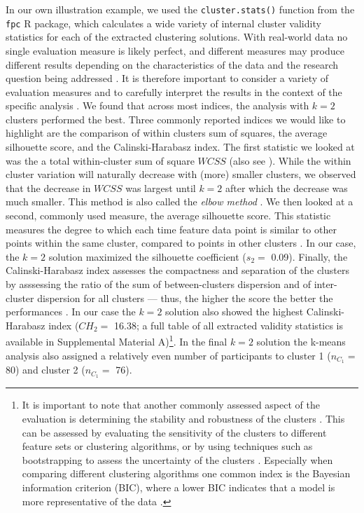 In our own illustration example, we used the \texttt{cluster.stats()}
function from the \texttt{fpc} \textsf{R} package, which calculates a
wide variety of internal cluster validity statistics for each of the
extracted clustering solutions. With real-world data no single
evaluation measure is likely perfect, and different measures may produce
different results depending on the characteristics of the data and the
research question being addressed \citep{kittler1998}. It is therefore
important to consider a variety of evaluation measures and to carefully
interpret the results in the context of the specific analysis
\citep{vinh2009}. We found that across most indices, the analysis with
\(k=2\) clusters performed the best. Three commonly reported indices we
would like to highlight are the comparison of within clusters sum of
squares, the average silhouette score, and the Calinski-Harabasz index.
The first statistic we looked at was the a total within-cluster sum of
square \(WCSS\) (also see ). While the within cluster
variation will naturally decrease with (more) smaller clusters, we
observed that the decrease in \(WCSS\) was largest until \(k=2\) after
which the decrease was much smaller. This method is also called the
\textit{elbow method} \citep{syakur2018}. We then looked at a second,
commonly used measure, the average silhouette score. This statistic
measures the degree to which each time feature data point is similar to
other points within the same cluster, compared to points in other
clusters \citep{rousseeuw1987}. In our case, the \(k=2\) solution
maximized the silhouette coefficient (\(s_2=\) 0.09). Finally, the
Calinski-Harabasz index assesses the compactness and separation of the
clusters by asssessing the ratio of the sum of between-clusters
dispersion and of inter-cluster dispersion for all clusters --- thus,
the higher the score the better the performances \citep{calinski1974}.
In our case the \(k=2\) solution also showed the highest
Calinski-Harabasz index (\(CH_2=\) 16.38; a full table of all extracted
validity statistics is available in Supplemental Material
A)\footnote{It is important to note that another commonly assessed aspect of the evaluation is determining the stability and robustness of the clusters \citep{berkhin2006}. This can be assessed by evaluating the sensitivity of the clusters to different feature sets or clustering algorithms, or by using techniques such as bootstrapping to assess the uncertainty of the clusters \citep{vinh2009}. Especially when comparing different clustering algorithms one common index is the Bayesian information criterion (BIC), where a lower BIC indicates that a model is more representative of the data \citep{vandeschoot2017}.}.
In the final \(k=2\) solution the k-means analysis also assigned a
relatively even number of participants to cluster 1 (\(n_{C_1}=\) 80)
and cluster 2 (\(n_{C_1}=\) 76).
